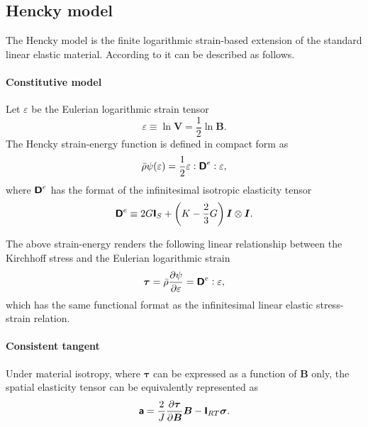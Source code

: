 \subsection{Hencky model}

The Hencky model is the finite logarithmic strain-based extension of the standard linear elastic material.
According to \cite{de2008computational} it can be described as follows.

\paragraph{Constitutive model}
Let \(\varepsilon\) be the Eulerian logarithmic strain tensor
\begin{equation} \label{eq:def_eulerian_log_strain}
\varepsilon \equiv \ln \boldsymbol{V}=\frac{1}{2} \ln \boldsymbol{B}.
\end{equation}
The Hencky strain-energy function is defined in compact form as
\begin{equation}
\bar{\rho} \psi(\varepsilon)=\frac{1}{2} \varepsilon: \boldsymbol{\mathsf{D}}^e: \varepsilon,
\end{equation}
where \(\boldsymbol{\mathsf{D}}^e\) has the format of the infinitesimal isotropic elasticity tensor
\begin{equation}
\boldsymbol{\mathsf{D}}^e \equiv 2 G \boldsymbol{\mathsf{I}}_{S}+\left(K-\frac{2}{3} G\right) \boldsymbol{I} \otimes \boldsymbol{I}.
\end{equation}

The above strain-energy renders the following linear relationship between the Kirchhoff stress and the Eulerian logarithmic strain
\begin{equation} \label{eq:hencky_stres_relation}
\bm\tau=\bar{\rho} \frac{\partial \psi}{\partial \varepsilon}=\boldsymbol{\mathsf{D}}^e: \varepsilon,
\end{equation}
which has the same functional format as the infinitesimal linear elastic stress-strain relation.

\paragraph{Consistent tangent}

Under material isotropy, where \(\boldsymbol{\tau}\) can be expressed as a function of \(\boldsymbol{B}\) only, the spatial elasticity tensor can be equivalently represented as
\begin{equation} \label{eq:hecky_spatial_tangent_moduli_1st}
\boldsymbol{\mathsf{a}}=\frac{2}{J} \frac{\partial \bm \tau}{\partial \bm B} \bm B-\boldsymbol{\mathsf{I}}_{RT}\bm \sigma .
\end{equation}

